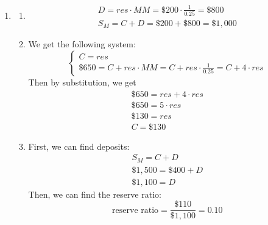 \documentclass{article}
\begin{document}
\begin{enumerate}
\begin{enumerate}
	\item $S_M = C + D = 0 + res \cdot MM = 0 + \$2,000 \cdot \frac{1}{0.1} = \$20,000$
	
	\item We get the following system:
		\begin{equation*}
		\begin{cases}
		C = D \\
		D = res \cdot MM = (\$2,000 - C) \cdot \frac{1}{0.1} = \$20,000 - 10C
		\end{cases}
		\end{equation*}
		Then by substitution, we get
		\begin{gather*}
		C = \$20,000 - 10C \\
		11C = \$20,000 \\
		C = \$1,818.18 \\
		D = \$1,818.18 \\
		\end{gather*}
		
		Therefore, \[S_M = C + D = \$1,818.18 + \$1,818.18 = \$3,636.36.\]
	
	\end{enumerate}
	
\item

	\begin{enumerate}

	\item 
		\begin{gather*}
		D = res \cdot MM = \$200 \cdot \frac{1}{0.25} = \$800 \\
		S_M = C + D = \$200 + \$800 = \$1,000
		\end{gather*}
		
	\item We get the following system:
		\begin{equation*}
		\begin{cases}
		C = res \\
		\$650 = C + res \cdot MM = C + res \cdot \frac{1}{0.25} = C + 4 \cdot res
		\end{cases}
		\end{equation*}
		Then by substitution, we get
		\begin{gather*}
		\$650 = res + 4 \cdot res \\
		\$650 = 5 \cdot res \\
		\$130 = res \\
		C = \$130
		\end{gather*}
		
	\item First, we can find deposits:
		\begin{gather*}
		S_M = C + D \\
		\$1,500 = \$400 + D \\
		\$1,100 = D
		\end{gather*}
		Then, we can find the reserve ratio:
		\begin{equation*}
		\text{reserve ratio} = \frac{\$110}{\$1,100} = 0.10
		\end{equation*}
		

	\end{enumerate}

\end{enumerate}
\end{document}
